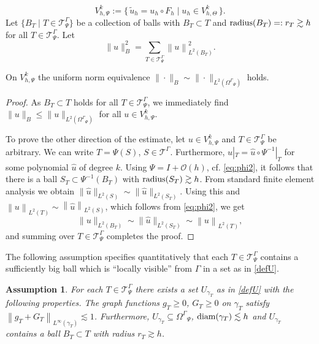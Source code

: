 \documentclass[final]{siamltex}
\newtheorem{assumption}{Assumption}
\begin{document}
 \[
  V_{h,\Psi}^k:= \{\, \tilde u_h = u_h \circ F_h \mid u_h \in {V_{h,\Theta}^k} \,\}.
 \]
Let $\{B_T\mid T\in {\mathcal{T}}^\Gamma_\Psi\}$ be a collection of balls with $B_T\subset T$ and ${\rm radius}(B_T)=: r_T\gtrsim h$ for all $T\in {\mathcal{T}}^\Gamma_\Psi$.
Let
\begin{equation}\label{eq:norm-B}
  \|u\|_B^2= \sum_{T\in{\mathcal{T}}^\Gamma_\Psi} {\left\lVert {u} \right\rVert}_{L^2(B_T)}^2.
\end{equation}

\begin{lemma}\label{la:norm-B}
  On $V_{h,\Psi}^k$ the uniform norm equivalence $\|\cdot\|_B \sim \|\cdot\|_{L^2({\Omega^{\Gamma}}_\Psi)}$ holds.
\end{lemma}\begin{proof}
As $B_T\subset T$ holds for all $T\in{\mathcal{T}}^\Gamma_\Psi$, we immediately find $\|u\|_B \le \|u\|_{L^2({\Omega^{\Gamma}}_\Psi)}$ for all $u\in V_{h,\Psi}^k$.

To prove the other direction of the estimate, let $u\in V_{h,\Psi}^k$ and $T\in{\mathcal{T}}^\Gamma_\Psi$ be arbitrary. We can write $T=\Psi(S)$, $S\in{{\mathcal{T}}^{\Gamma}}$. Furthermore, $u|_T=\hat u\circ \Psi^{-1}|_T$ for some polynomial $\hat u$ of degree $k$. Using $\Psi= I + \mathcal{O}(h)$, cf. \eqref{eq:phi2}, it follows that there is a ball $S_T \subset \Psi^{-1}(B_T)$ with ${\rm radius}(S_T) \gtrsim h$. From standard finite element analysis we obtain $\|\hat u\|_{L^2(S)} \sim \|\hat u\|_{L^2(S_T)}$. Using this and 
$
  {\left\lVert {u} \right\rVert}_{L^2(T)}\sim {\left\lVert {\hat u} \right\rVert}_{L^2(S)} $, which follows from \eqref{eq:phi2}, we get
\[
 \| u\|_{L^2(B_T)} \sim \|\hat u\|_{L^2(S_T)}\sim {\left\lVert {u} \right\rVert}_{L^2(T)},
\]
and summing over $T\in{\mathcal{T}}^\Gamma_\Psi$ completes the proof.
\end{proof}

The following assumption specifies quantitatively that each $T\in{\mathcal{T}}^\Gamma_\Psi$ contains a sufficiently big ball which is ``locally visible'' from $\Gamma$ in a set as in \eqref{defU}.

\begin{assumption}\label{as:local-tubular-neighborhoods}
  For each $T\in{\mathcal{T}}^\Gamma_\Psi$ there exists a set $U_{\gamma_T}$ as in \eqref{defU} with the following properties. The graph functions $g_T\ge 0$, $G_T\ge 0$ on $\gamma_T$ satisfy ${\left\lVert {g_T+G_T} \right\rVert}_{L^\infty(\gamma_T)}\lesssim 1$. Furthermore, $U_{\gamma_T} \subseteq {\Omega^{\Gamma}}_\Psi$, ${\rm diam}(\gamma_T) \lesssim h$ and $U_{\gamma_T}$ contains a ball $B_T\subset T$ with radius $r_T\gtrsim h$.
\end{assumption}
\end{document}
